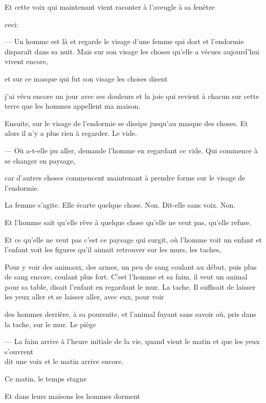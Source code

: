 Et cette voix qui maintenant vient raconter à l'aveugle à sa fenêtre

ceci:

--- Un homme est là et regarde le visage d'une femme qui dort et
l'endormie disparaît dans sa nuit. Mais sur son visage les choses
qu'elle a vécues aujourd'hui vivent encore,

et sur ce masque qui fut son visage les choses disent

j'ai vécu encore un jour avec ses douleurs et la joie qui revient à
chacun sur cette terre que les hommes appellent ma maison.

Ensuite, sur le visage de l'endormie se dissipe jusqu'au masque des
choses. Et alors il n'y a plus rien à regarder. Le vide.

--- Où a-t-elle pu aller, demande l'homme en regardant ce vide. Qui
commence à se changer en paysage,

car d'autres choses commencent maintenant à prendre forme sur le visage
de l'endormie.

La femme s'agite. Elle écarte quelque chose. Non. Dit-elle sans voix.
Non.

Et l'homme sait qu'elle rêve à quelque chose qu'elle ne veut pas,
qu'elle refuse.

Et ce qu'elle ne veut pas c'est ce paysage qui surgit, où l'homme voit
un enfant et l'enfant voit les figures qu'il aimait retrouver sur les
murs, les taches,

Pour y voir des animaux, des armes, un peu de sang coulant au début,
puis plus de sang encore, coulant plus fort. C'est l'homme et sa faim,
il veut un animal pour sa table, disait l'enfant en regardant le mur. La
tache. Il suffisait de laisser les yeux aller et se laisser aller, avec
eux, pour voir

des hommes derrière, à sa poursuite, et l'animal fuyant sans savoir où,
pris dans la tache, sur le mur. Le piège

\pagebreak

\vspace*{4cm}

--- La faim arrive à l'heure initiale de la vie, quand vient le matin et
que les yeux s'ouvrent\\

dit une voix et le matin arrive encore.

Ce matin, le temps stagne

Et dans leurs maisons les hommes dorment\\

